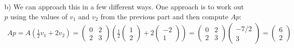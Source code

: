 {\begin{enumerate}
        \item[b)] We can approach this in a few different ways. One approach is to work out $p$ using the values of $v_1$ and $v_2$ from the previous part and then compute $Ap$: 
        \begin{align}
            Ap = A (\frac12 v_1 + 2v_2) = \begin{pmatrix} 0&2\\2&3\end{pmatrix}\left( \frac12 \begin{pmatrix} 1\\2 \end{pmatrix} +2 \begin{pmatrix} -2\\1\end{pmatrix}\right) = \begin{pmatrix} 0&2\\2&3\end{pmatrix}\begin{pmatrix} -7/2\\ 3\end{pmatrix} = \begin{pmatrix} 6\\2\end{pmatrix}
        \end{align}
        

\end{enumerate}}
